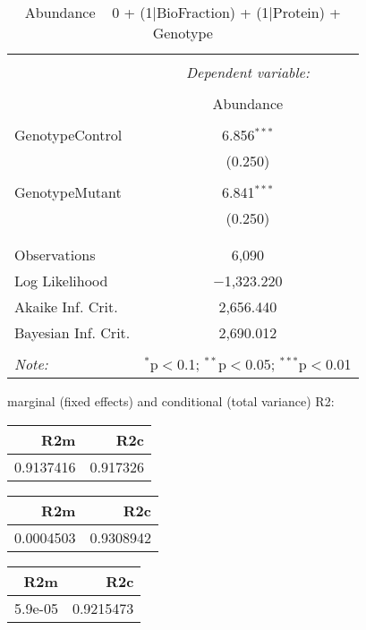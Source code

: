 \documentclass[11pt]{report}
\begin{document}
\begin{table}[!htbp] \centering 
  \caption{Abundance ~ 0 + (1|BioFraction) + (1|Protein) + Genotype} 
  \label{} 
\begin{tabular}{@{\extracolsep{5pt}}lc} 
\\[-1.8ex]\hline 
\hline \\[-1.8ex] 
 & \multicolumn{1}{c}{\textit{Dependent variable:}} \\ 
\cline{2-2} 
\\[-1.8ex] & Abundance \\ 
\hline \\[-1.8ex] 
 GenotypeControl & 6.856$^{***}$ \\ 
  & (0.250) \\ 
  & \\ 
 GenotypeMutant & 6.841$^{***}$ \\ 
  & (0.250) \\ 
  & \\ 
\hline \\[-1.8ex] 
Observations & 6,090 \\ 
Log Likelihood & $-$1,323.220 \\ 
Akaike Inf. Crit. & 2,656.440 \\ 
Bayesian Inf. Crit. & 2,690.012 \\ 
\hline 
\hline \\[-1.8ex] 
\textit{Note:}  & \multicolumn{1}{r}{$^{*}$p$<$0.1; $^{**}$p$<$0.05; $^{***}$p$<$0.01} \\ 
\end{tabular} 
\end{table} 
marginal (fixed effects) and conditional (total variance) R2:

\begin{tabular}{r|r}
\hline
R2m & R2c\\
\hline
0.9137416 & 0.917326\\
\hline
\end{tabular}

\begin{tabular}{r|r}
\hline
R2m & R2c\\
\hline
0.0004503 & 0.9308942\\
\hline
\end{tabular}

\begin{tabular}{r|r}
\hline
R2m & R2c\\
\hline
5.9e-05 & 0.9215473\\
\hline
\end{tabular}
\end{document}
